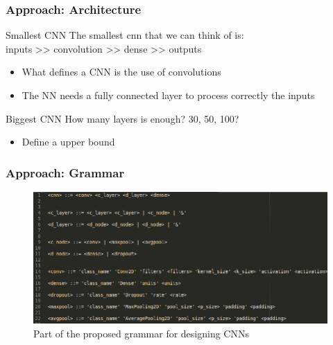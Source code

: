\documentclass[aspectratio=169]{beamer}
\begin{document}
		\begin{frame}
			\frametitle{Approach: Architecture}
			
			\begin{block}{Smallest CNN}
				The smallest cnn that we can think of is:\\
				inputs >> convolution >> dense >> outputs
			\end{block}
			
			\begin{itemize}
				\item What defines a CNN is the use of convolutions
				\item The NN needs a fully connected layer to process correctly the inputs
			\end{itemize}
			
			\begin{block}{Biggest CNN}
				How many layers is enough? 30, 50, 100?
			\end{block}
			
			\begin{itemize}
				\item Define a upper bound
			\end{itemize}
			
		\end{frame}
		\begin{frame}
			\frametitle{Approach: Grammar}
			
			\begin{figure}
				\includegraphics[width=\linewidth]{images/cnn-bnf.png}
				\caption{Part of the proposed grammar for designing CNNs}
			\end{figure}
		\end{frame}
\end{document}

